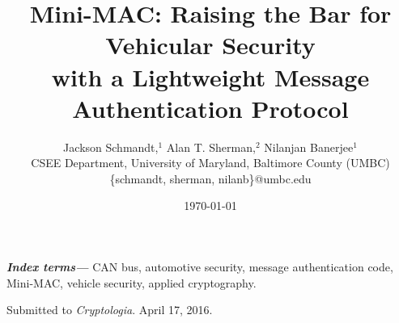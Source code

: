 \documentclass[12pt,twocolumn]{article}
\providecommand{\keywords}[1]{\textbf{\textit{Index terms---}} #1}
\begin{document}
\doublespacing

\title{Mini-MAC: Raising the Bar for Vehicular Security\\
with a Lightweight Message Authentication Protocol}



\author{Jackson Schmandt,$^1$
Alan T. Sherman,$^2$ 
Nilanjan Banerjee$^1$\\
CSEE Department, University of Maryland, Baltimore County (UMBC)\\
\{schmandt, sherman, nilanb\}@umbc.edu\\}

\date{\today}

\maketitle




\keywords{CAN bus,
	automotive security,
	message authentication code,
	Mini-MAC,
	vehicle security,
	applied cryptography.
}
















	






\clearpage



\bigskip \noindent
Submitted to {\it Cryptologia}. {April 17, 2016}.
\end{document}
